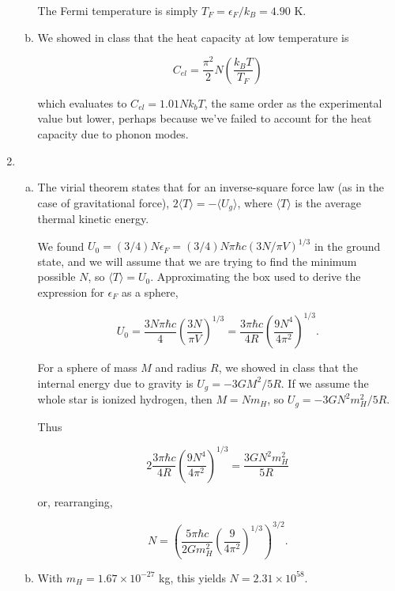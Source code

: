 \documentclass{article}
\begin{document}
\begin{enumerate}
\begin{enumerate}[(a)]
		The Fermi temperature is simply $T_F = \epsilon_F / k_B = 4.90$ K.

		\item

		We showed in class that the heat capacity at low temperature is

		$$C_{el} = \frac{\pi^2}{2}N \left(\frac{k_B T}{T_F} \right)$$

		which evaluates to $C_{el} = 1.01 Nk_bT$, the same order as the experimental value but lower, perhaps because we've failed to account for the heat capacity due to phonon modes.

	\end{enumerate}

	\item

	\begin{enumerate}[(a)]

		\item

		The virial theorem states that for an inverse-square force law (as in the case of gravitational force), $2 \langle T \rangle = - \langle U_g \rangle$, where $\langle T \rangle$ is the average thermal kinetic energy.

		We found $U_0 = (3/4) N \epsilon_F = (3/4) N \pi \hbar c (3N/\pi V )^{1/3}$ in the ground state, and we will assume that we are trying to find the minimum possible $N$, so $\langle T \rangle = U_0$. Approximating the box used to derive the expression for $\epsilon_F$ as a sphere,

		$$U_0 = \frac{3N \pi \hbar c}{4} \left(\frac{3N}{\pi V}\right)^{1/3} = \frac{3 \pi \hbar c}{4R} \left(\frac{9N^4}{4\pi^2}\right)^{1/3}.$$

		For a sphere of mass $M$ and radius $R$, we showed in class that the internal energy due to gravity is $U_g = -3 GM^2/5R$. If we assume the whole star is ionized hydrogen, then $M = N m_H$, so $U_g = -3GN^2 m_H^2 / 5R$.

		Thus

		$$2  \frac{3\pi \hbar c}{4 R} \left(\frac{9N^4}{4\pi^2}\right)^{1/3} = \frac{3 G N^2 m_H^2}{5R}$$

		or, rearranging,

		$$N = \left( \frac{5 \pi \hbar c}{2 G m_H^2} \left(\frac{9}{4 \pi^2} \right)^{1/3} \right)^{3/2}.$$

		\item

		With $m_H = 1.67 \times 10^{-27}$ kg, this yields $N = 2.31 \times 10^{58}$.


\end{enumerate}
\end{enumerate}
\end{document}

